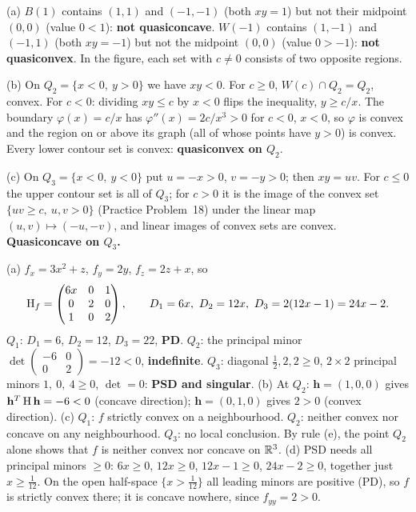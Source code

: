 \begin{solutions}
  \item (a) $B(1)$ contains $(1,1)$ and $(-1,-1)$ (both $xy=1$) but not
        their midpoint $(0,0)$ (value $0<1$): \textbf{not quasiconcave}.
        $W(-1)$ contains $(1,-1)$ and $(-1,1)$ (both $xy=-1$) but not the
        midpoint $(0,0)$ (value $0>-1$): \textbf{not quasiconvex}. In the
        figure, each set with $c\ne0$ consists of two opposite regions.

        (b) On $Q_2=\{x<0,\ y>0\}$ we have $xy<0$. For $c\ge0$,
        $W(c)\cap Q_2=Q_2$, convex. For $c<0$: dividing $xy\le c$ by $x<0$
        flips the inequality, $y\ge c/x$. The boundary
        $\varphi(x)=c/x$ has $\varphi''(x)=2c/x^{3}>0$ for $c<0$, $x<0$,
        so $\varphi$ is convex and the region on or above its graph (all
        of whose points have $y>0$) is convex. Every lower contour set is
        convex: \textbf{quasiconvex on $Q_2$}.

        (c) On $Q_3=\{x<0,\ y<0\}$ put $u=-x>0$, $v=-y>0$; then $xy=uv$.
        For $c\le0$ the upper contour set is all of $Q_3$; for $c>0$ it is
        the image of the convex set $\{uv\ge c,\ u,v>0\}$ (Practice
        Problem~18) under the linear map $(u,v)\mapsto(-u,-v)$, and linear
        images of convex sets are convex. \textbf{Quasiconcave on $Q_3$.}

  \item (a) $f_x=3x^{2}+z$, $f_y=2y$, $f_z=2z+x$, so
        \[
          \operatorname{H}_f=\begin{pmatrix}6x&0&1\\0&2&0\\1&0&2\end{pmatrix},
          \qquad D_1=6x,\ D_2=12x,\ D_3=2(12x-1)=24x-2 .
        \]
        $Q_1$: $D_1=6$, $D_2=12$, $D_3=22$, \textbf{PD}. $Q_2$: the
        principal minor $\det\begin{pmatrix}-6&0\\0&2\end{pmatrix}=-12<0$,
        \textbf{indefinite}. $Q_3$: diagonal $\tfrac12,2,2\ge0$, $2\times2$
        principal minors $1,\ 0,\ 4\ge0$, $\det=0$: \textbf{PSD and
        singular}.
        (b) At $Q_2$: $\mathbf{h}=(1,0,0)$ gives
        $\mathbf{h}^{T}\operatorname{H}\mathbf{h}=-6<0$ (concave direction);
        $\mathbf{h}=(0,1,0)$ gives $2>0$ (convex direction).
        (c) $Q_1$: $f$ strictly convex on a neighbourhood. $Q_2$: neither
        convex nor concave on any neighbourhood. $Q_3$: no local
        conclusion. By rule (e), the point $Q_2$ alone shows that $f$ is
        neither convex nor concave on $\mathbb{R}^{3}$.
        (d) PSD needs all principal minors $\ge0$: $6x\ge0$, $12x\ge0$,
        $12x-1\ge0$, $24x-2\ge0$, together just $x\ge\tfrac1{12}$. On the
        open half-space $\{x>\tfrac1{12}\}$ all leading minors are positive
        (PD), so $f$ is strictly convex there; it is concave nowhere, since
        $f_{yy}=2>0$.


\end{solutions}
